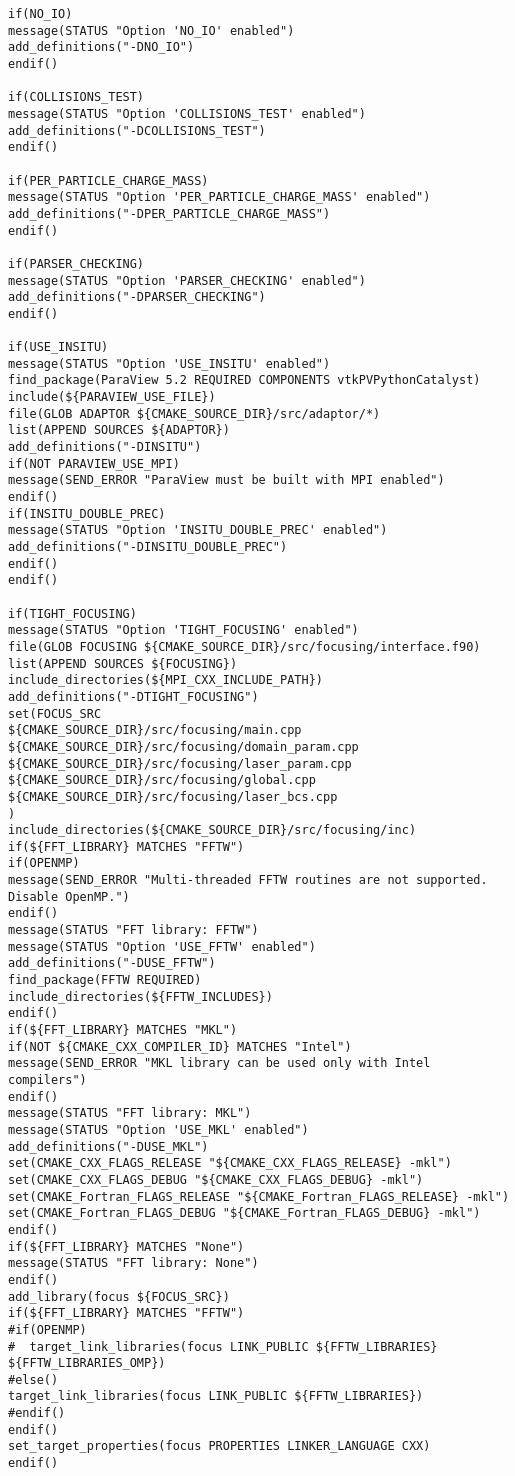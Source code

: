\begin{lstlisting}[style=FORTRAN, caption=EPOCH CMakeLists file to generate platform-specific build scripts]
if(NO_IO)
message(STATUS "Option 'NO_IO' enabled")
add_definitions("-DNO_IO")
endif()

if(COLLISIONS_TEST)
message(STATUS "Option 'COLLISIONS_TEST' enabled")
add_definitions("-DCOLLISIONS_TEST")
endif()

if(PER_PARTICLE_CHARGE_MASS)
message(STATUS "Option 'PER_PARTICLE_CHARGE_MASS' enabled")
add_definitions("-DPER_PARTICLE_CHARGE_MASS")
endif()

if(PARSER_CHECKING)
message(STATUS "Option 'PARSER_CHECKING' enabled")
add_definitions("-DPARSER_CHECKING")
endif()

if(USE_INSITU)
message(STATUS "Option 'USE_INSITU' enabled")
find_package(ParaView 5.2 REQUIRED COMPONENTS vtkPVPythonCatalyst)
include(${PARAVIEW_USE_FILE})
file(GLOB ADAPTOR ${CMAKE_SOURCE_DIR}/src/adaptor/*)
list(APPEND SOURCES ${ADAPTOR})
add_definitions("-DINSITU")
if(NOT PARAVIEW_USE_MPI)
message(SEND_ERROR "ParaView must be built with MPI enabled")
endif()
if(INSITU_DOUBLE_PREC)
message(STATUS "Option 'INSITU_DOUBLE_PREC' enabled")
add_definitions("-DINSITU_DOUBLE_PREC")
endif()
endif()

if(TIGHT_FOCUSING)
message(STATUS "Option 'TIGHT_FOCUSING' enabled")
file(GLOB FOCUSING ${CMAKE_SOURCE_DIR}/src/focusing/interface.f90)
list(APPEND SOURCES ${FOCUSING})
include_directories(${MPI_CXX_INCLUDE_PATH})
add_definitions("-DTIGHT_FOCUSING")
set(FOCUS_SRC
${CMAKE_SOURCE_DIR}/src/focusing/main.cpp
${CMAKE_SOURCE_DIR}/src/focusing/domain_param.cpp
${CMAKE_SOURCE_DIR}/src/focusing/laser_param.cpp
${CMAKE_SOURCE_DIR}/src/focusing/global.cpp
${CMAKE_SOURCE_DIR}/src/focusing/laser_bcs.cpp
)
include_directories(${CMAKE_SOURCE_DIR}/src/focusing/inc)
if(${FFT_LIBRARY} MATCHES "FFTW")
if(OPENMP)
message(SEND_ERROR "Multi-threaded FFTW routines are not supported. Disable OpenMP.")
endif()
message(STATUS "FFT library: FFTW")
message(STATUS "Option 'USE_FFTW' enabled")
add_definitions("-DUSE_FFTW")
find_package(FFTW REQUIRED)
include_directories(${FFTW_INCLUDES})
endif()
if(${FFT_LIBRARY} MATCHES "MKL")
if(NOT ${CMAKE_CXX_COMPILER_ID} MATCHES "Intel")
message(SEND_ERROR "MKL library can be used only with Intel compilers")
endif()
message(STATUS "FFT library: MKL")
message(STATUS "Option 'USE_MKL' enabled")
add_definitions("-DUSE_MKL")
set(CMAKE_CXX_FLAGS_RELEASE "${CMAKE_CXX_FLAGS_RELEASE} -mkl")
set(CMAKE_CXX_FLAGS_DEBUG "${CMAKE_CXX_FLAGS_DEBUG} -mkl")
set(CMAKE_Fortran_FLAGS_RELEASE "${CMAKE_Fortran_FLAGS_RELEASE} -mkl")
set(CMAKE_Fortran_FLAGS_DEBUG "${CMAKE_Fortran_FLAGS_DEBUG} -mkl")
endif()
if(${FFT_LIBRARY} MATCHES "None")
message(STATUS "FFT library: None")
endif()
add_library(focus ${FOCUS_SRC})
if(${FFT_LIBRARY} MATCHES "FFTW")
#if(OPENMP)
#  target_link_libraries(focus LINK_PUBLIC ${FFTW_LIBRARIES} ${FFTW_LIBRARIES_OMP})
#else()
target_link_libraries(focus LINK_PUBLIC ${FFTW_LIBRARIES})
#endif()
endif()
set_target_properties(focus PROPERTIES LINKER_LANGUAGE CXX)
endif()


\end{lstlisting}

